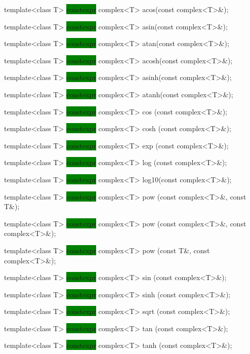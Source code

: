 \documentclass[prd,twocolumn,amsmath,amssymb,nofootinbib,eqsecnum]{revtex4-1}
\newcommand{\code}[1]{{\tt #1}}
\newcommand{\highlight}[1]{\colorbox{green}{\!\!\!\! #1}}
\begin{document}
\code{

\vspace{2ex}
  template<class T> \highlight{constexpr} complex<T> acos(const complex<T>\&);

  template<class T> \highlight{constexpr} complex<T> asin(const complex<T>\&);

  template<class T> \highlight{constexpr} complex<T> atan(const complex<T>\&);

\vspace{2ex}

  template<class T> \highlight{constexpr} complex<T> acosh(const complex<T>\&);

  template<class T> \highlight{constexpr} complex<T> asinh(const complex<T>\&);

  template<class T> \highlight{constexpr} complex<T> atanh(const complex<T>\&);

\vspace{2ex}

  template<class T> \highlight{constexpr} complex<T> cos  (const complex<T>\&);

  template<class T> \highlight{constexpr} complex<T> cosh (const complex<T>\&);

  template<class T> \highlight{constexpr} complex<T> exp  (const complex<T>\&);

  template<class T> \highlight{constexpr} complex<T> log  (const complex<T>\&);

  template<class T> \highlight{constexpr} complex<T> log10(const complex<T>\&);

\vspace{2ex}

  template<class T> \highlight{constexpr} complex<T> pow  (const complex<T>\&, const T\&);

  template<class T> \highlight{constexpr} complex<T> pow  (const complex<T>\&, const complex<T>\&);

  template<class T> \highlight{constexpr} complex<T> pow  (const T\&, const complex<T>\&);

\vspace{2ex}

  template<class T> \highlight{constexpr} complex<T> sin  (const complex<T>\&);

  template<class T> \highlight{constexpr} complex<T> sinh (const complex<T>\&);

  template<class T> \highlight{constexpr} complex<T> sqrt (const complex<T>\&);

  template<class T> \highlight{constexpr} complex<T> tan  (const complex<T>\&);

  template<class T> \highlight{constexpr} complex<T> tanh (const complex<T>\&);
}
\end{document}

